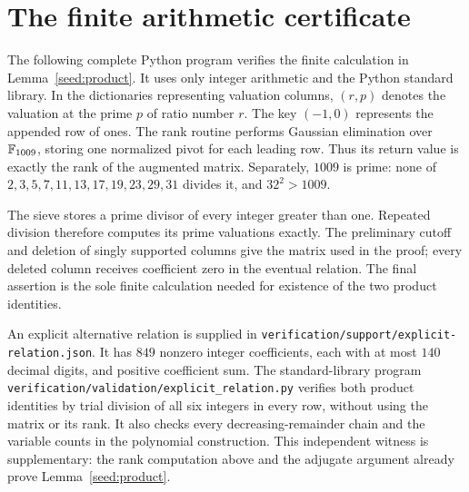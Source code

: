 \section{The finite arithmetic certificate}
\label{app:certificate}

The following complete Python program verifies the finite calculation in Lemma~\ref{seed:product}. It uses only integer arithmetic and the Python standard library. In the dictionaries representing valuation columns, $(r,p)$ denotes the valuation at the prime $p$ of ratio number $r$. The key $(-1,0)$ represents the appended row of ones. The rank routine performs Gaussian elimination over $\mathbb F_{1009}$, storing one normalized pivot for each leading row. Thus its return value is exactly the rank of the augmented matrix. Separately, $1009$ is prime: none of $2,3,5,7,11,13,17,19,23,29,31$ divides it, and $32^2>1009$.

The sieve stores a prime divisor of every integer greater than one. Repeated division therefore computes its prime valuations exactly. The preliminary cutoff and deletion of singly supported columns give the matrix used in the proof; every deleted column receives coefficient zero in the eventual relation. The final assertion is the sole finite calculation needed for existence of the two product identities.

\newpage


\noindent An explicit alternative relation is supplied in
\nolinkurl{verification/support/explicit-relation.json}. It has $849$ nonzero integer
coefficients, each with at most $140$ decimal digits, and positive
coefficient sum. The standard-library program
\nolinkurl{verification/validation/explicit_relation.py} verifies both product
identities by trial division of all six integers in every row, without
using the matrix or its rank. It also checks every decreasing-remainder
chain and the variable counts in the polynomial construction. This
independent witness is supplementary: the rank computation above and the
adjugate argument already prove Lemma~\ref{seed:product}.
